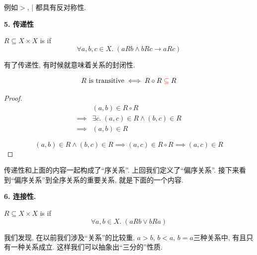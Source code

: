 例如$>$, $|$ 都具有反对称性. 

\textbf{5. 传递性}

\begin{definition}
  $R \subseteq X \times X$ is  if
  \[
    \forall a, b, c \in X.\; (a R b \land b R c \to a R c)
  \]

  \begin{center}
\end{center}
\end{definition}

有了传递性, 有时候就意味着关系的封闭性. 
\begin{theorem}
  \[
    R \text{ is transitive} \iff R \circ R \;\textcolor{red}{\subseteq}\; R
  \]
\end{theorem}
\begin{proof}
  \setcounter{equation}{0}
  \begin{align*}
    &(a, b) \in R \circ R \\
    \implies& \exists c.\; (a, c) \in R \land (b, c) \in R \\
    \implies& (a, b) \in R
  \end{align*}

  \vspace{0.30cm}
  
    \[
      (a, b) \in R \land (b, c) \in R
      \implies (a, c) \in R \circ R
      \implies (a, c) \in R
    \]
  
\end{proof}

传递性和上面的内容一起构成了``序关系''. 上回我们定义了``偏序关系''. 接下来看到``偏序关系''到全序关系的重要关系, 就是下面的一个内容. 


\textbf{6. 连接性.}

\begin{definition}
  $R \subseteq X \times X$ is  if
  \[
    \forall a, b \in X.\; (a R b \lor b R a)
  \]
\end{definition}

我们发现, 在以前我们涉及``关系''的比较重, $a>b$, $b<a$, $b=a$三种关系中, 有且只有一种关系成立. 这样我们可以抽象出``三分的''性质.  

